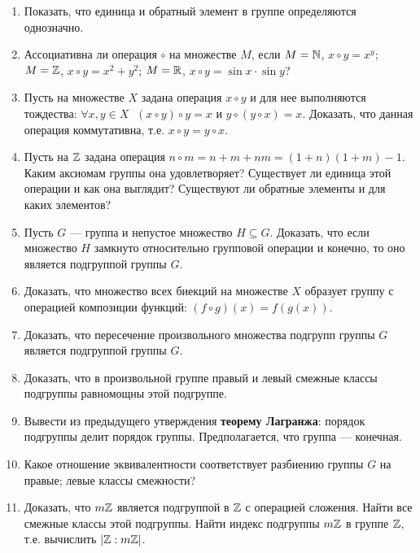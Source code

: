 \begin{enumerate}
\item Показать, что единица и обратный элемент в группе определяются однозначно.

\item Ассоциативна ли операция $\circ$ на множестве $M$, если 
\ipunkt $M = \mathbb N$, $x\circ y = x^y$;
\ipunkt $M = \mathbb Z$, $x\circ y = x^2 + y^2$;
\ipunkt $M = \mathbb R$, $x\circ y = \sin x \cdot \sin y$?

\item Пусть на множестве $X$ задана операция $x\circ y$ и для нее выполняются тождества: $\forall x,y\in X\;$ $(x\circ y)\circ y=x$ и $y\circ(y\circ x)=x$. Доказать, что данная операция коммутативна, т.е. $x\circ y=y\circ x$.

\item Пусть на $\mathbb Z$ задана операция $n\circ m = n+m+nm=(1+n)(1+m)-1$. Каким аксиомам группы она удовлетворяет? Существует ли единица этой операции и как она выглядит? Существуют ли обратные элементы и для каких элементов?

\item Пусть $G$ --- группа и непустое множество $H\subseteq G$. Доказать, что если множество $H$ замкнуто относительно групповой операции и конечно, то оно является подгруппой группы $G$.

\item Доказать, что множество всех биекций на множестве $X$ образует группу с операцией композиции функций: $(f\circ g)(x)=f(g(x))$.

\item Доказать, что пересечение произвольного множества подгрупп группы $G$ является подгруппой группы $G$.

\item Доказать, что в произвольной группе правый и левый смежные классы подгруппы равномощны этой подгруппе.

\item Вывести из предыдущего утверждения \textbf{теорему Лагранжа}: порядок подгруппы делит порядок группы. Предполагается, что группа --- конечная.

\item Какое отношение эквивалентности соответствует разбиению группы $G$ на \ipunkt правые; \ipunkt левые классы смежности?

\item Доказать, что $m\mathbb Z$ является подгруппой в $\mathbb Z$ с операцией сложения. Найти все смежные классы этой подгруппы. Найти индекс подгруппы $m\mathbb Z$ в группе $\mathbb Z$, т.е. вычислить $|\mathbb Z:m\mathbb Z|$.


\end{enumerate}
